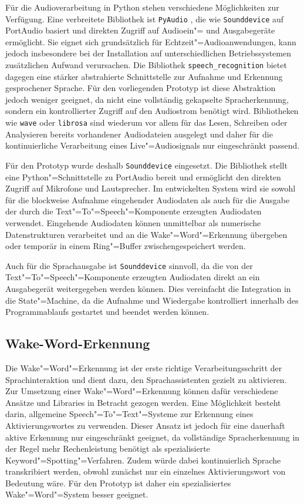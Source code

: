 Für die Audioverarbeitung in Python stehen verschiedene Möglichkeiten zur Verfügung. Eine verbreitete Bibliothek ist \texttt{PyAudio} \autocite{PyAudio-Documentation}, die wie \texttt{Sounddevice} \autocite{Sounddevice-Documentation} auf PortAudio basiert und direkten Zugriff auf Audioein"= und Ausgabegeräte ermöglicht. Sie eignet sich grundsätzlich für Echtzeit"=Audioanwendungen, kann jedoch insbesondere bei der Installation auf unterschiedlichen Betriebssystemen zusätzlichen Aufwand verursachen. Die Bibliothek \texttt{speech\_recognition} \autocite{Speechrecognition-Documentation} bietet dagegen eine stärker abstrahierte Schnittstelle zur Aufnahme und Erkennung gesprochener Sprache. Für den vorliegenden Prototyp ist diese Abstraktion jedoch weniger geeignet, da nicht eine vollständig gekapselte Spracherkennung, sondern ein kontrollierter Zugriff auf den Audiostrom benötigt wird. Bibliotheken wie \texttt{wave} \autocite{Python314-Documentation} oder \texttt{librosa} \autocite{Librosa-Documentation} sind wiederum vor allem für das Lesen, Schreiben oder Analysieren bereits vorhandener Audiodateien ausgelegt und daher für die kontinuierliche Verarbeitung eines Live"=Audiosignals nur eingeschränkt passend.

Für den Prototyp wurde deshalb \texttt{Sounddevice} eingesetzt. Die Bibliothek stellt eine Python"=Schnittstelle zu PortAudio bereit und ermöglicht den direkten Zugriff auf Mikrofone und Lautsprecher. Im entwickelten System wird sie sowohl für die blockweise Aufnahme eingehender Audiodaten als auch für die Ausgabe der durch die Text"=To"=Speech"=Komponente erzeugten Audiodaten verwendet. Eingehende Audiodaten können unmittelbar als numerische Datenstrukturen verarbeitet und an die Wake"=Word"=Erkennung übergeben oder temporär in einem Ring"=Buffer zwischengespeichert werden.

Auch für die Sprachausgabe ist \texttt{Sounddevice} sinnvoll, da die von der Text"=To"=Speech"=Komponente erzeugten Audiodaten direkt an ein Ausgabegerät weitergegeben werden können. Dies vereinfacht die Integration in die State"=Machine, da die Aufnahme und Wiedergabe kontrolliert innerhalb des Programmablaufs gestartet und beendet werden können.


\subsection{Wake-Word-Erkennung}
\label{subsec:Wake_Word_Erkennung}
Die Wake"=Word"=Erkennung ist der erste richtige Verarbeitungsschritt der
Sprachinteraktion und dient dazu, den Sprachassistenten gezielt zu aktivieren. Zur Umsetzung einer Wake"=Word"=Erkennung können dafür verschiedene Ansätze und Libraries in Betracht gezogen werden. Eine Möglichkeit besteht darin, allgemeine Speech"=To"=Text"=Systeme zur Erkennung eines Aktivierungswortes zu verwenden. Dieser Ansatz ist jedoch für eine dauerhaft aktive Erkennung nur eingeschränkt geeignet, da vollständige Spracherkennung in der Regel mehr Rechenleistung benötigt als spezialisierte Keyword"=Spotting"=Verfahren. Zudem würde dabei kontinuierlich Sprache transkribiert werden, obwohl zunächst nur ein einzelnes Aktivierungswort von Bedeutung wäre. Für den Prototyp ist daher ein spezialisiertes Wake"=Word"=System besser geeignet.

